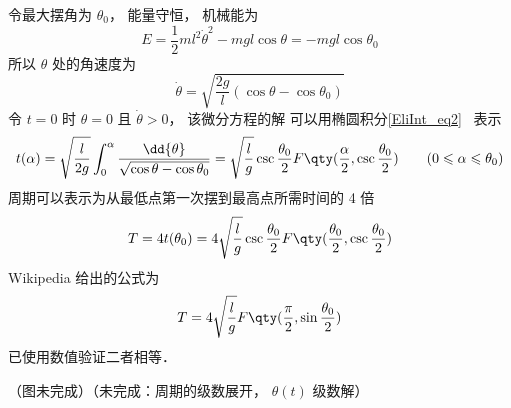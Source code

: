 

令最大摆角为 $\theta_0$， 能量守恒， 机械能为
\begin{equation}
E = \frac{1}{2} m l^2 \dot \theta^2 - mg l \cos\theta = - mg l \cos\theta_0
\end{equation}
所以 $\theta$ 处的角速度为
\begin{equation}
\dot{\theta} = \sqrt{\frac{2g}{l} (\cos\theta - \cos\theta_0) }
\end{equation}
令 $t = 0$ 时 $\theta = 0$ 且 $\dot{\theta} > 0$， 该微分方程的解%
可以用椭圆积分\autoref{EliInt_eq2}~ 表示
\begin{equation}
t(\alpha) = \sqrt{\frac{l}{2g}} \int_0^{\alpha} \frac{\dd{\theta}}{\sqrt{\cos\theta - \cos\theta_0}}
= \sqrt{\frac{l}{g}} \csc\frac{\theta_0}{2} F\qty(\frac{\alpha}{2}, \csc\frac{\theta_0}{2})
\qquad (0 \leqslant \alpha \leqslant \theta_0)
\end{equation}
周期可以表示为从最低点第一次摆到最高点所需时间的 4 倍
\begin{equation}
T = 4t(\theta_0) = 4 \sqrt{\frac{l}{g}} \csc\frac{\theta_0}{2} F\qty(\frac{\theta_0}{2}, \csc\frac{\theta_0}{2})
\end{equation}
Wikipedia 给出的公式为
\begin{equation}
T = 4 \sqrt{\frac{l}{g}} F\qty(\frac{\pi}{2}, \sin\frac{\theta_0}{2})
\end{equation}
已使用数值验证二者相等．

（图未完成）（未完成：周期的级数展开， $\theta(t)$ 级数解）
